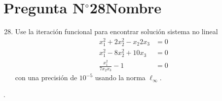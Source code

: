 \section{Pregunta N$^{\circ}$28\qquad Nombre}

\begin{frame}
	\begin{enumerate}\setcounter{enumi}{27}
		\item

		      Use la iteración funcional para encontrar solución
		      sistema no lineal
		      \begin{align*}
			      x^{2}_{1}+2x^{2}_{2}-x_{2}2x_{3} & =0 \\
			      x^{2}_{1}-8x^2_{2}+10x_{3}       & =0 \\
			      \frac{x_{1}^{2}}{7x_{2}x_{3}}-1  & =0
		      \end{align*}
		      con una precisión de
		      $10^{-5}$ usando la norma $\ell_{\infty}$.
	\end{enumerate}

	\begin{solution}
		.
	\end{solution}
\end{frame}